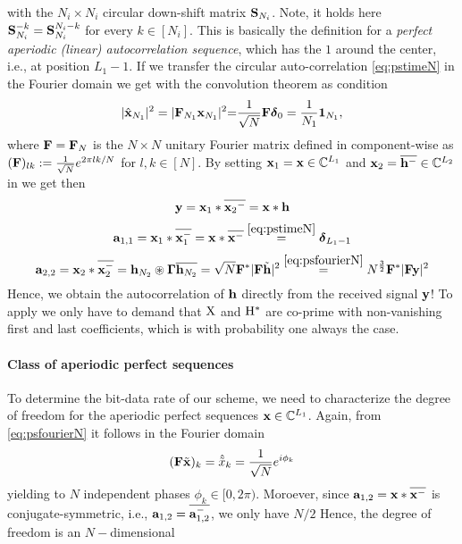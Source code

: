 \documentclass[conference]{IEEEtran}
\begin{document}
%
with the $N_i\times N_i$ circular down-shift matrix $\mathbf S _{N_i}$. Note, it holds here $\mathbf S _{N_i}^{-k}=\mathbf S _{N_i}^{N_i-k}$
for every $k\in [N_i]$.  This is basically the definition for a \emph{perfect aperiodic (linear) autocorrelation
sequence}, which has the $1$ around the center, i.e., at position $L_1-1$.  If we transfer the circular auto-correlation
\eqref{eq:pstimeN} in the Fourier domain we get with the convolution theorem as condition
%
\begin{align}
  |{\hat{\mathbf x}}_{N_1}|^2=|{\mathbf F}_{N_1} {\mathbf x}_{N_1}|^2{=}\frac{1}{\sqrt{N}}{\mathbf F}\boldsymbol \delta_0=\frac{1}{N_1}{\mathbf 1}_{N_1}\label{eq:psfourierN},
\end{align}
%
where ${\mathbf F}={\mathbf F_N}$ is the $N\times N$ unitary Fourier matrix defined in  component-wise as
$({\mathbf F})_{lk}:=\frac{1}{\sqrt{N}}e^{2\pi lk/N}$ for $l,k\in[N]$.  By setting ${\mathbf x_1}={\mathbf x}\in{\ensuremath{\mathbb C}}^{{{L}_1}}$ and
${\mathbf x_2}={\overline{{\mathbf h}^-}}\in{\ensuremath{\mathbb C}}^{{{L}_2}}$ in  we get then
%
\begin{equation}
  {\ensuremath{\mathbf y}}={\mathbf x_1} *{\overline{{\mathbf x_2}^-}}={\mathbf x}*{\mathbf h}
\end{equation}
\begin{equation}
  {\ensuremath{\mathbf a}}_{1,1}={\mathbf x_1}*{\overline{{\mathbf x}_1^{-}}}={\mathbf x}*{\overline{{\mathbf x}^-}}\overset{\eqref{eq:pstimeN}}{=}\boldsymbol \delta_{L_1-1}
\end{equation}
\begin{equation}
  {\ensuremath{\mathbf a}}_{2,2}={\mathbf x_2}*{\overline{{\mathbf x_2^{-}}}}={\mathbf h}_{N_2}\circledast\mathbf{\Gamma}{\overline{{\mathbf h}_{N_2}}}
       =\sqrt{N}{\mathbf F^*}|{\mathbf F}\tilde{\mathbf h}|^2\overset{\eqref{eq:psfourierN}}{=}
       N^{\frac{3}{2}}{\mathbf F^*}|{\mathbf F} {\mathbf y}|^2
\end{equation}
%
Hence, we obtain the autocorrelation of ${\mathbf h}$ directly from the received signal ${\mathbf y}$! 
To apply  we only have to demand that ${\mathrm X}$ and ${\mathrm H}^*$ are co-prime with non-vanishing first
and last coefficients, which is with probability one always the case. 

\paragraph{Class of aperiodic perfect sequences}

To determine the bit-data rate of our scheme, we need to characterize the degree of freedom for the aperiodic perfect
sequences ${\mathbf x}\in{\ensuremath{\mathbb C}}^{L_1}$. 
Again, from \eqref{eq:psfourierN} it follows in the Fourier domain
\begin{align}
  ({\mathbf F} \tilde{\mathbf x})_k =\hat{\tilde{x}}_k = \frac{1}{\sqrt{N}} e^{i\phi_k}
\end{align}
yielding to $N$ independent phases $\phi_k\in[0,2\pi)$.
  Moroever, since ${\mathbf a}_{1,2}={\mathbf x}*{\overline{ {\mathbf x}^-}}$ is conjugate-symmetric, i.e., ${\mathbf a}_{1,2} ={\overline{{\mathbf a}_{1,2}^-}}$, we only have
  $N/2$ 
Hence, the degree of freedom is an $N-$dimensional 
\end{document}
